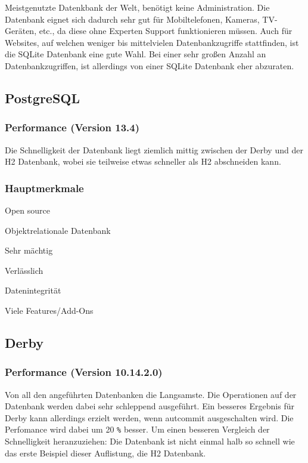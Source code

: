 Meistgenutzte Datenkbank der Welt, benötigt keine Administration. Die Datenbank eignet sich dadurch sehr gut für Mobiltelefonen, Kameras, TV-Geräten, etc., da diese ohne Experten Support funktionieren müssen. Auch für Websites, auf welchen weniger bis mittelvielen Datenbankzugriffe stattfinden, ist die SQLite Datenbank eine gute Wahl. Bei einer sehr großen Anzahl an Datenbankzugriffen, ist allerdings von einer SQLite Datenbank eher abzuraten. 

\subsection{PostgreSQL}
\subsubsection{Performance (Version 13.4)}
Die Schnelligkeit der Datenbank liegt ziemlich mittig zwischen der Derby und der H2 Datenbank, wobei sie teilweise etwas schneller als H2 abschneiden kann. 

\subsubsection{Hauptmerkmale}

\begin{compactitem}
    \item Open source
    \item Objektrelationale Datenbank         
    \item Sehr mächtig
    \item Verlässlich
    \item Datenintegrität
    \item Viele Features/Add-Ons
\end{compactitem}

\subsection{Derby}
\subsubsection{Performance (Version 10.14.2.0)}
Von all den angeführten Datenbanken die Langsamste. Die Operationen auf der Datenbank werden dabei sehr schleppend ausgeführt. Ein besseres Ergebnis für Derby kann allerdings erzielt werden, wenn autcommit ausgeschalten wird. Die Perfomance wird dabei um 20 \texttt{\%} besser. Um einen besseren Vergleich der Schnelligkeit heranzuziehen: Die Datenbank ist nicht einmal halb so schnell wie das erste Beispiel dieser Auflistung, die H2 Datenbank. 

